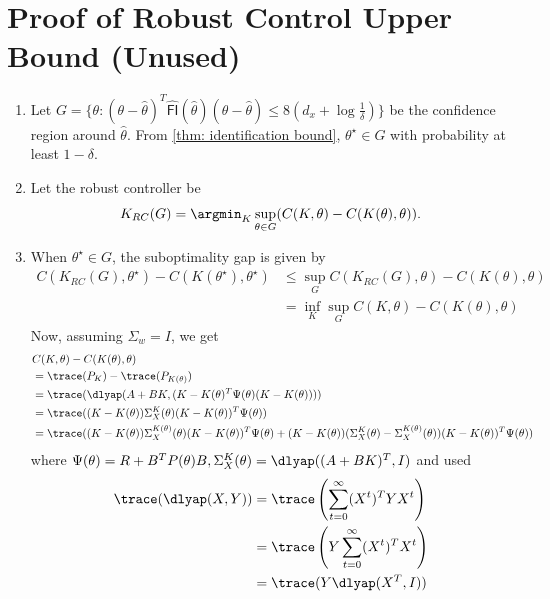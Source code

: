 \section{Proof of Robust Control Upper Bound (Unused)}
\begin{enumerate}
\item Let $G = \{\theta : (\theta - \hat\theta)^T\mathsf{\hat{FI}}(\hat\theta)(\theta-\hat\theta)\leq8(d_x+\log\frac{1}{\delta})\}$ be the confidence region around $\hat\theta$. From \cref{thm: identification bound}, $\theta^\star\in G$ with probability at least $1-\delta$. 
\item Let the robust controller be 
\begin{align*}
    {K}_{RC}(G) = \argmin_{K}\sup_{\theta\in G}(C(K, {\theta}) - C(K(\theta), {\theta})).
\end{align*}
\item When $\theta^\star\in G$, the suboptimality gap is given by
\begin{align*}
    C(K_{RC}(G), \theta^\star) - C(K(\theta^\star), \theta^\star) 
    &\leq \sup_GC(K_{RC}(G), \theta) - C(K(\theta), \theta) \\
    &= \inf_K\sup_GC(K, \theta) - C(K(\theta), \theta)
\end{align*}
Now, assuming $\Sigma_w = I$, we get 
\begin{align*}
    &C(K,\theta) - C(K(\theta), \theta) \\
    &= \trace(P_K) - \trace (P_{K(\theta)}) \\
    &= \trace (\dlyap (A+BK, (K-K(\theta)^T\Psi(\theta)(K-K(\theta)))) \\
    &= \trace ((K-K(\theta))\Sigma_X^K(\theta)(K-K(\theta))^T\Psi(\theta)) \\
    &= \trace ((K-K(\theta))\Sigma_X^{K(\theta)}(\theta)(K-K(\theta))^T\Psi(\theta) + (K-K(\theta))(\Sigma_X^K(\theta) - \Sigma_X^{K(\theta)}(\theta))(K-K(\theta))^T\Psi(\theta))
\end{align*}
where $\Psi(\theta) = R + B^TP(\theta)B, \Sigma_X^K(\theta) = \dlyap((A+BK)^T, I)$ and used
\begin{align*}
    \trace(\dlyap(X,Y)) &= \trace\left(\sum_{t=0}^{\infty}(X^t)^TYX^t\right) \\
    &= \trace \left(Y\sum_{t=0}^{\infty}(X^t)^TX^t\right)\\
    &= \trace (Y\dlyap(X^T, I))
\end{align*}


\end{enumerate}
